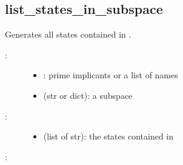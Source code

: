 \documentclass[letterpaper,10pt,english]{sphinxmanual}
\begin{document}
\subsection{list\_states\_in\_subspace}
\label{\detokenize{StateTransitionGraphs:list-states-in-subspace}}\label{\detokenize{StateTransitionGraphs:id15}}

\begin{fulllineitems}
\label{\detokenize{StateTransitionGraphs:PyBoolNet.StateTransitionGraphs.list_states_in_subspace}}
Generates all states contained in .
\begin{description}
\item[{:}] \leavevmode\begin{itemize}
\item {} 
: prime implicants or a list of names

\item {} 
 (str or dict): a subspace

\end{itemize}

\item[{:}] \leavevmode\begin{itemize}
\item {} 
 (list of str): the states contained in 

\end{itemize}

\end{description}

:

\begin{sphinxVerbatim}[commandchars=\\\{\}]
  
\end{sphinxVerbatim}

\end{fulllineitems}
\end{document}
